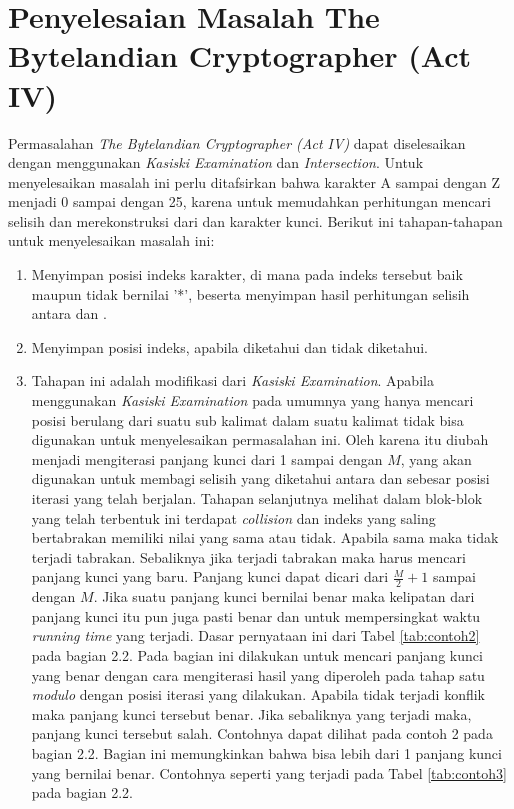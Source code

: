 	\section{Penyelesaian Masalah The Bytelandian Cryptographer (Act IV)}
	\label{chapter:solving}
	Permasalahan \textit{The Bytelandian Cryptographer (Act IV)} dapat diselesaikan dengan menggunakan \textit{Kasiski Examination} dan \textit{Intersection}. Untuk menyelesaikan masalah ini perlu ditafsirkan bahwa karakter A sampai dengan Z menjadi 0 sampai dengan 25, karena untuk memudahkan perhitungan mencari selisih dan merekonstruksi \plaintext dari \ciphertext dan karakter kunci. Berikut ini tahapan-tahapan untuk menyelesaikan masalah ini:
	\begin{enumerate}
	\item Menyimpan posisi indeks karakter, di mana pada indeks tersebut baik \ciphertext maupun \plaintext tidak bernilai '*', beserta menyimpan hasil perhitungan selisih antara \ciphertext dan \plaintext\cite{john_jones_spoj_2009}.
	\item Menyimpan posisi indeks, apabila  \ciphertext diketahui dan \plaintext tidak diketahui\cite{john_jones_spoj_2009}.
	\item Tahapan ini adalah modifikasi dari \textit{Kasiski Examination}. Apabila menggunakan \textit{Kasiski Examination} pada umumnya yang hanya mencari posisi berulang dari suatu sub kalimat dalam suatu kalimat tidak bisa digunakan untuk menyelesaikan permasalahan ini. Oleh karena itu diubah menjadi mengiterasi panjang kunci dari 1 sampai dengan $M$, yang akan digunakan untuk membagi selisih yang diketahui antara \plaintext dan \ciphertext sebesar posisi iterasi yang telah berjalan. Tahapan selanjutnya melihat dalam blok-blok yang telah terbentuk ini terdapat \textit{collision} dan indeks yang saling bertabrakan memiliki nilai yang sama atau tidak. Apabila sama maka tidak terjadi tabrakan. Sebaliknya jika terjadi tabrakan maka harus mencari panjang kunci yang baru. Panjang kunci dapat dicari dari $\frac{M}{2}+1$ sampai dengan $M$. Jika suatu panjang kunci bernilai benar maka kelipatan dari panjang kunci itu pun juga pasti benar dan untuk mempersingkat waktu \textit{running time} yang terjadi. Dasar pernyataan ini dari Tabel  \ref{tab:contoh2} pada bagian 2.2. Pada bagian ini dilakukan untuk mencari panjang kunci yang benar dengan cara mengiterasi hasil yang diperoleh pada tahap satu \textit{modulo} dengan posisi iterasi yang dilakukan. Apabila tidak terjadi konflik maka panjang kunci tersebut benar. Jika sebaliknya yang terjadi maka, panjang kunci tersebut salah. Contohnya dapat dilihat pada contoh 2 pada bagian 2.2. Bagian ini memungkinkan bahwa bisa lebih dari 1 panjang kunci yang bernilai benar. Contohnya seperti yang terjadi pada Tabel \ref{tab:contoh3} pada bagian 2.2. 

\end{enumerate}
